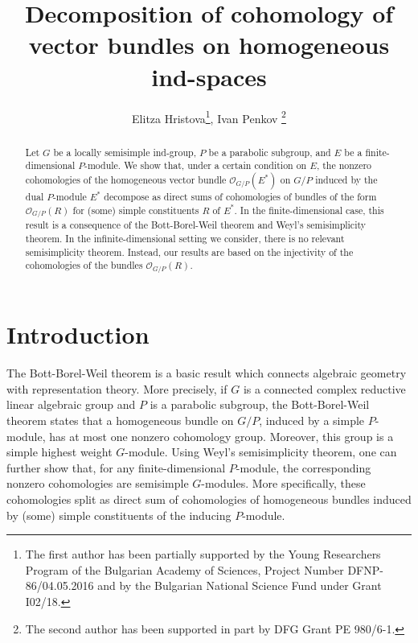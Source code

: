 \documentclass[12pt]{article}
\def \OO {{\mathcal O}}
\begin{document}
\title{Decomposition of cohomology of vector bundles on homogeneous ind-spaces}

\author{Elitza Hristova\thanks{The first author has been partially supported by the Young Researchers Program of the Bulgarian Academy of Sciences, Project Number DFNP-86/04.05.2016 and by the Bulgarian National Science Fund under Grant I02/18.}, Ivan Penkov \thanks{The second author has been supported in part by DFG Grant PE 980/6-1.}}

\date{}


\maketitle


\begin{abstract} Let $G$ be a locally semisimple ind-group, $P$ be a parabolic subgroup, and $E$ be a finite-dimensional $P$-module. We show that, under a certain condition on $E$, the nonzero cohomologies of the homogeneous vector bundle $\OO_{G/P}(E^*)$ on $G/P$ induced by the dual $P$-module $E^*$ decompose as direct sums of cohomologies of bundles of the form $\OO_{G/P}(R)$ for (some)  simple constituents $R$ of $E^*$. In the finite-dimensional case, this result is a consequence of the Bott-Borel-Weil theorem and Weyl's semisimplicity theorem. In the infinite-dimensional setting we consider, there is no relevant semisimplicity theorem. Instead, our results are based on the injectivity of the cohomologies of the bundles $\OO_{G/P}(R)$.
\end{abstract}  




\section{Introduction}
The Bott-Borel-Weil theorem is a basic result which connects algebraic geometry with representation theory. More precisely, if $G$ is a connected complex reductive linear algebraic group and $P$ is a parabolic subgroup, the Bott-Borel-Weil theorem states that a homogeneous bundle on $G/P$, induced by a simple $P$-module, has at most one nonzero cohomology group. Moreover, this group is a simple highest weight $G$-module. Using Weyl's semisimplicity theorem, one can further show that, for any finite-dimensional $P$-module, the corresponding nonzero cohomologies are semisimple $G$-modules. More specifically, these cohomologies split as direct sum of cohomologies of homogeneous bundles induced by (some) simple constituents of the inducing $P$-module.
\end{document}
